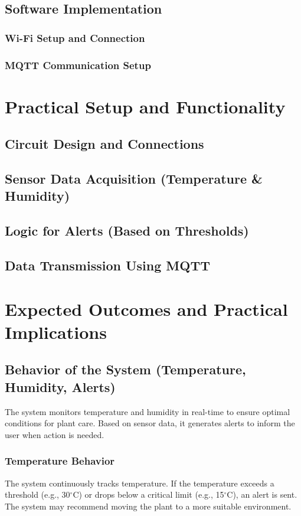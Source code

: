 \documentclass[12pt,a4paper,oneside,english]{book}
\begin{document}
\subsection{Software Implementation}
\subsubsection{Wi-Fi Setup and Connection}
\subsubsection{MQTT Communication Setup}

\section{Practical Setup and Functionality}
\subsection{Circuit Design and Connections}
\subsection{Sensor Data Acquisition (Temperature \& Humidity)}
\subsection{Logic for Alerts (Based on Thresholds)}
\subsection{Data Transmission Using MQTT}

\section{Expected Outcomes and Practical Implications}
\subsection{Behavior of the System (Temperature, Humidity, Alerts)}
The system monitors temperature and humidity in real-time to ensure optimal conditions for plant care. Based on sensor data, it generates alerts to inform the user when action is needed.

\subsubsection{Temperature Behavior}
The system continuously tracks temperature. If the temperature exceeds a threshold (e.g., 30$^\circ$C) or drops below a critical limit (e.g., 15$^\circ$C), an alert is sent. The system may recommend moving the plant to a more suitable environment.
\end{document}
